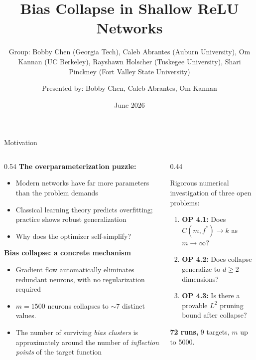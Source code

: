 \documentclass[aspectratio=169, 10pt]{beamer}
\title[Bias Collapse in Shallow ReLU Networks]{%
  Bias Collapse in Shallow ReLU Networks}
\author[Presented by: Bobby Chen, Caleb Abrantes, Om Kannan]{Presented by: Bobby Chen, Caleb Abrantes, Om Kannan}
\subtitle{Group: Bobby Chen (Georgia Tech), Caleb Abrantes (Auburn University), Om Kannan (UC Berkeley), Rayshawn Holscher (Tuskegee University), Shari Pinckney (Fort Valley State University)}
\institute{NSF RTG}
\date{June 2026}
\newcommand{\fstar}{f^\ast}
\begin{document}
\begin{frame}[plain]
  \titlepage
\end{frame}

\begin{frame}{Motivation}
  \begin{columns}[T]
    \begin{column}{0.54\textwidth}
      \textbf{The overparameterization puzzle:}
      \begin{itemize}\small
        \item Modern networks have far more parameters than
              the problem demands
        \item Classical learning theory predicts overfitting;
              practice shows robust generalization
        \item \alert{Why does the optimizer self-simplify?}
      \end{itemize}
      \vspace{0.4em}
      \textbf{Bias collapse: a concrete mechanism}
      \begin{itemize}\small
        \item Gradient flow automatically eliminates redundant
              neurons, with no regularization required
        \item $m = 1500$ neurons collapses to $\sim7$ distinct values.
        \item The number of surviving \emph{bias clusters}
              is approximately around the number of \emph{inflection points}
              of the target function
      \end{itemize}
    \end{column}
    \begin{column}{0.44\textwidth}
      \begin{tcolorbox}[slideboxA, title={This work}]
        \small
        Rigorous numerical investigation of three
        open problems:
        \vspace{4pt}
        \begin{enumerate}
          \item \textbf{OP 4.1:} Does $C(m,\fstar) \to k$
                as $m \to \infty$?
          \item \textbf{OP 4.2:} Does collapse generalize
                to $d \geq 2$ dimensions?
          \item \textbf{OP 4.3:} Is there a provable
                $L^2$ pruning bound after collapse?
        \end{enumerate}
        \vspace{4pt}
        \textbf{72 runs,} 9 targets, $m$ up to 5000.
      \end{tcolorbox}
    \end{column}
  \end{columns}
\end{frame}
\end{document}

